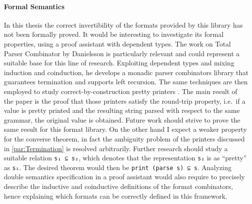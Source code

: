\documentclass[../Thesis.tex]{subfiles}
\begin{document}
\paragraph{Formal Semantics}
In this thesis the correct invertibility of the formats provided by this
library has not been formally proved.
It would be interesting to investigate its formal properties, using
a proof assistant with dependent types.
The work on Total Parser Combinator by Danielsson 
\cite{TotalParserCombinator} is particularly relevant and could
represent a suitable base for this line of research.
Exploiting dependent types and mixing induction and coinduction, 
he develops a monadic parser combinators library that guarantees 
termination and supports left recursion.
The same techniques are then employed to study correct-by-construction
pretty printers \cite{CorrectByConstruction}. The main result of the paper
is the proof that those printers satisfy the round-trip property,
i.e.\ if a value is pretty printed and the resulting string parsed with respect
to the same grammar, the original value is obtained.
Future work should strive to prove the same result for this format library.
On the other hand I expect a weaker property for the converse theorem, in fact 
the ambiguity problem of the printers discussed in \ref{par:Termination}
is resolved arbitrarily. Further research should study a suitable relation
\texttt{s₁ ⊆ s₂}, which denotes that the representation \texttt{s₂}
is as ``pretty'' as \texttt{s₁}.
The desired theorem would then be \texttt{print (parse s) ⊆ s}.
Analyzing double semantics specification in a proof assistant would
also require to precisely describe the inductive and coinductive definitions
of the format combinators, hence explaining which formats can be 
correctly defined in this framework.

%	
% 	
\end{document}
